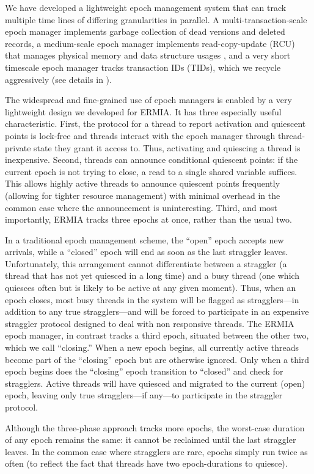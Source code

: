 We have developed a lightweight epoch management system that can track multiple time lines of differing granularities in parallel. A multi-transaction-scale epoch manager implements garbage collection of dead versions and deleted records, a medium-scale epoch manager implements read-copy-update (RCU) that manages physical memory and data structure usages \cite{McKenneyS98}, and a very short timescale epoch manager tracks transaction IDs (TIDs), which we recycle aggressively (see details in ).

The widespread and fine-grained use of epoch managers is enabled by a very lightweight design we developed for ERMIA. It has three especially useful characteristic. First, the protocol for a thread to report activation and quiescent points is lock-free and threads interact with the epoch manager through thread-private state they grant it access to. Thus, activating and quiescing a thread is inexpensive. Second, threads can announce conditional quiescent points: if the current epoch is not trying to close, a read to a single shared variable suffices. This allows highly active threads to announce quiescent points frequently (allowing for tighter resource management) with minimal overhead in the common case where the announcement is uninteresting. Third, and most importantly, ERMIA tracks three epochs at once, rather than the usual two.

In a traditional epoch management scheme, the ``open'' epoch accepts new arrivals, while a ``closed'' epoch will end as soon as the last straggler leaves. Unfortunately, this arrangement cannot differentiate between a straggler (a thread that has not yet quiesced in a long time) and a busy thread (one which quiesces often but is likely to be active at any given moment). Thus, when an epoch closes, most busy threads in the system will be flagged as stragglers---in addition to any true stragglers---and will be forced to participate in an expensive straggler protocol designed to deal with non responsive threads. The ERMIA epoch manager, in contrast tracks a third epoch, situated between the other two, which we call ``closing.'' When a new epoch begins, all currently active threads become part of the ``closing'' epoch but are otherwise ignored. Only when a third epoch begins does the ``closing'' epoch transition to ``closed'' and check for stragglers. Active threads will have quiesced and migrated to the current (open) epoch, leaving only true stragglers---if any---to participate in the straggler protocol.

Although the three-phase approach tracks more epochs, the worst-case duration of any epoch remains the same: it cannot be reclaimed until the last straggler leaves. In the common case where stragglers are rare, epochs simply run twice as often (to reflect the fact that threads have two epoch-durations to quiesce). 

